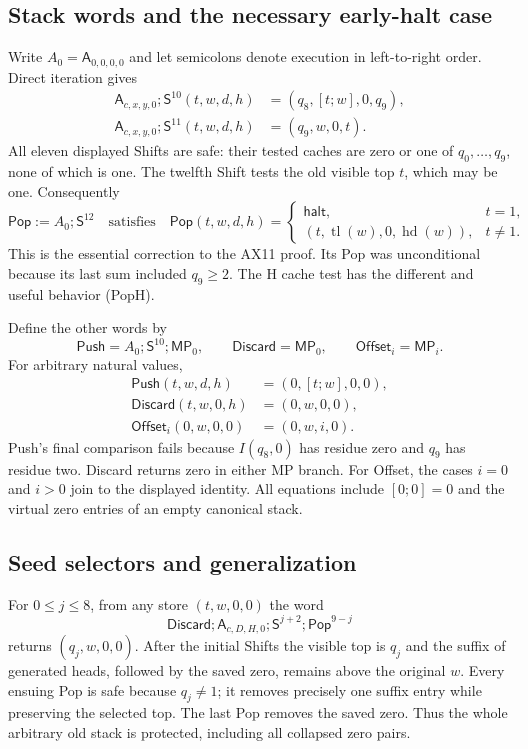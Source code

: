 \subsection{Stack words and the necessary early-halt case}

Write $A_0=\mathsf A_{0,0,0,0}$ and let semicolons denote execution in
left-to-right order.  Direct iteration gives
\begin{align*}
 \mathsf A_{c,x,y,0};\mathsf S^{10}(t,w,d,h)
       &=(q_8,[t;w],0,q_9),\\
 \mathsf A_{c,x,y,0};\mathsf S^{11}(t,w,d,h)
       &=(q_9,w,0,t).
\end{align*}
All eleven displayed Shifts are safe: their tested caches are zero or
one of $q_0,\ldots,q_9$, none of which is one.  The twelfth Shift tests
the old visible top $t$, which may be one.  Consequently
\[
 \mathsf{Pop}:=A_0;\mathsf S^{12}
 \quad\text{satisfies}\quad
 \mathsf{Pop}(t,w,d,h)=
 \begin{cases}
  \mathsf{halt},&t=1,\\
  (t,\operatorname{tl}(w),0,\operatorname{hd}(w)),&t\ne1.
 \end{cases}                                                   \tag{PopH}
\]
This is the essential correction to the AX11 proof.  Its Pop was
unconditional because its last sum included $q_9\geq2$.  The H cache
test has the different and useful behavior (PopH).

Define the other words by
\[
 \mathsf{Push}=A_0;\mathsf S^{10};\mathsf{MP}_0,
 \qquad \mathsf{Discard}=\mathsf{MP}_0,
 \qquad \mathsf{Offset}_i=\mathsf{MP}_i.
\]
For arbitrary natural values,
\begin{align*}
 \mathsf{Push}(t,w,d,h)&=(0,[t;w],0,0),\\
 \mathsf{Discard}(t,w,0,h)&=(0,w,0,0),\\
 \mathsf{Offset}_i(0,w,0,0)&=(0,w,i,0).
\end{align*}
Push's final comparison fails because $I(q_8,0)$ has residue zero and
$q_9$ has residue two.  Discard returns zero in either MP branch.
For Offset, the cases $i=0$ and $i>0$ join to the displayed identity.
All equations include $[0;0]=0$ and the virtual zero entries of an
empty canonical stack.

\subsection{Seed selectors and generalization}

For $0\leq j\leq8$, from any store $(t,w,0,0)$ the word
\[
 \mathsf{Discard};\mathsf A_{c,D,H,0};
       \mathsf S^{j+2};\mathsf{Pop}^{9-j}                       \tag{SelH}
\]
returns $(q_j,w,0,0)$.  After the initial Shifts the visible top is
$q_j$ and the suffix of generated heads, followed by the saved zero,
remains above the original $w$.  Every ensuing Pop is safe because
$q_j\ne1$; it removes precisely one suffix entry while preserving the
selected top.  The last Pop removes the saved zero.  Thus the whole
arbitrary old stack is protected, including all collapsed zero pairs.

